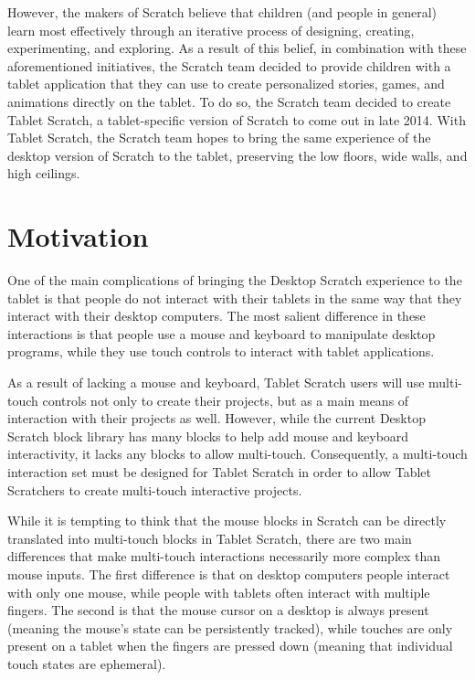However, the makers of Scratch believe that children (and people in general) learn most effectively through an iterative process of designing, creating, experimenting, and exploring. As a result of this belief, in combination with these aforementioned initiatives, the Scratch team decided to provide children with a tablet application that they can use to create personalized stories, games, and animations directly on the tablet. To do so, the Scratch team decided to create Tablet Scratch, a tablet-specific version of Scratch to come out in late 2014. With Tablet Scratch, the Scratch team hopes to bring the same experience of the desktop version of Scratch to the tablet, preserving the low floors, wide walls, and high ceilings.

\section{Motivation}
One of the main complications of bringing the Desktop Scratch experience to the tablet is that people do not interact with their tablets in the same way that they interact with their desktop computers. The most salient difference in these interactions is that people use a mouse and keyboard to manipulate desktop programs, while they use touch controls to interact with tablet applications.

As a result of lacking a mouse and keyboard, Tablet Scratch users will use multi-touch controls not only to create their projects, but as a main means of interaction with their projects as well. However, while the current Desktop Scratch block library has many blocks to help add mouse and keyboard interactivity, it lacks any blocks to allow multi-touch. Consequently, a multi-touch interaction set must be designed for Tablet Scratch in order to allow Tablet Scratchers to create multi-touch interactive projects.

While it is tempting to think that the mouse blocks in Scratch can be directly translated into multi-touch blocks in Tablet Scratch, there are two main differences that make multi-touch interactions necessarily more complex than mouse inputs. The first difference is that on desktop computers people interact with only one mouse, while people with tablets often interact with multiple fingers. The second is that the mouse cursor on a desktop is always present (meaning the mouse's state can be persistently tracked), while touches are only present on a tablet when the fingers are pressed down (meaning that individual touch states are ephemeral).

